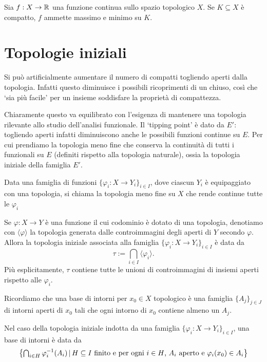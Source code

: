 \begin{theorem}[Weierstrass]
	Sia $f:X \to \mathbb{R}$ una funzione continua sullo spazio topologico $X$.
	Se $K \subseteq X$ è compatto, $f$ ammette massimo e minimo su $K$.
\end{theorem}

\section{Topologie iniziali}
Si può artificialmente aumentare il numero di compatti togliendo aperti dalla topologia. Infatti questo diminuisce i possibili ricoprimenti di un chiuso, così che `sia più facile' per un insieme soddisfare la proprietà di compattezza.

Chiaramente questo va equilibrato con l'esigenza di mantenere una topologia rilevante allo studio dell'analisi funzionale. Il `tipping point' è dato da $E'$: togliendo aperti infatti diminuiscono anche le possibili funzioni continue su $E$. Per cui prendiamo la topologia meno fine che conserva la continuità di tutti i funzionali su $E$ (definiti rispetto alla topologia naturale), ossia la topologia iniziale della famiglia $E'$.

\begin{definition}
	Data una famiglia di funzioni $\{\varphi_i : X \to Y_i\}_{i \in I}$, dove ciascun $Y_i$ è equipaggiato con una topologia, si chiama  la topologia meno fine su $X$ che rende continue tutte le $\varphi_i$
\end{definition}

Se $\varphi : X \to Y$ è una funzione il cui codominio è dotato di una topologia, denotiamo con $\langle \varphi \rangle$ la topologia generata dalle controimmagini degli aperti di $Y$ secondo $\varphi$. Allora la topologia iniziale associata alla famiglia $\{\varphi_i : X \to Y_i\}_{i \in I}$ è data da
\begin{equation*}
	\tau := \bigcap_{i \in I} \langle \varphi_i \rangle.
\end{equation*}
Più esplicitamente, $\tau$ contiene tutte le unioni di controimmagini di insiemi aperti rispetto alle $\varphi_i$.

Ricordiamo che una base di intorni per $x_0 \in X$ topologico è una famiglia $\{A_j\}_{j \in J}$ di intorni aperti di $x_0$ tali che ogni intorno di $x_0$ contiene almeno un $A_j$.

Nel caso della topologia iniziale indotta da una famiglia $\{\varphi_i : X \to Y_i\}_{i \in I}$, una base di intorni è data da
\begin{equation}
\label{eq:neigh_basis}
	\left\{ {\textstyle \bigcap_{i \in H} \varphi_i^{-1}(A_i)} \,|\, \text{$H \subseteq I$ finito e per ogni $i \in H$, $A_i$ aperto e $\varphi_i(x_0) \in A_i$} \right\}
\end{equation}


